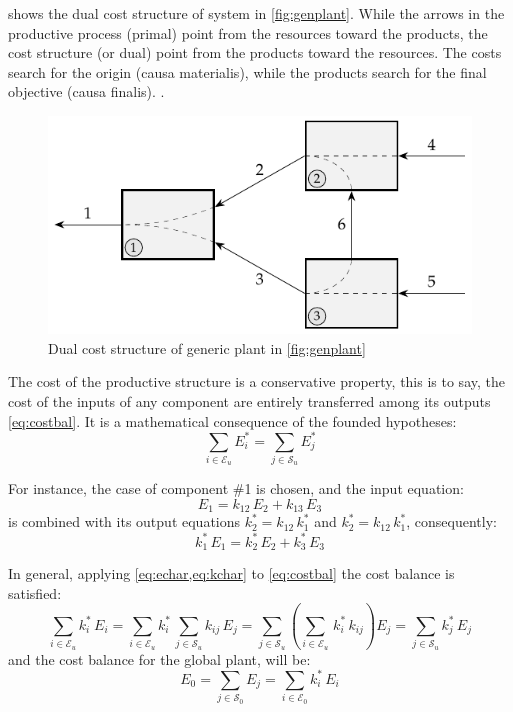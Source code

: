 \documentclass[energies,article,submit,moreauthors,pdftex]{Definitions/mdpi}
\begin{document}
 shows the dual cost structure of system in \cref{fig:genplant}. While the arrows in the productive process (primal) point from the resources toward the products, the cost structure (or dual) point from the products toward the resources. The costs search for the origin (causa materialis), while the products search for the final objective (causa finalis). \cite{Valero1990d}.

\begin{figure}[ht]
    \centering
    \includegraphics{genplantr}
    \caption{Dual cost structure of generic plant in \cref{fig:genplant}}
    \label{fig:genplantr}
\end{figure}

The cost of the productive structure is a conservative property, this is to say, the cost of the inputs of any component are entirely transferred among its outputs \cref{eq:costbal}. It is a mathematical consequence of the founded hypotheses:
\begin{equation}
    \sum_{i\in\mathcal{E}_u}{E_i^*}=\sum_{j\in\mathcal{S}_u}{E_j^*}
    \label{eq:costbal}
\end{equation}

For instance, the case of component \#1 is chosen, and the input equation:
\[
E_1=k_{12}\,E_2+k_{13}\,E_3
\] 
is combined with its output equations $k_2^*=k_{12}\,k_1^*$ and $k_2^*=k_{12}\,k_1^*$, consequently: 
\[
 k_1^*\,E_1 = k_2^*\,E_2+k_3^*\,E_3
\]

In general, applying \cref{eq:echar,eq:kchar} to \cref{eq:costbal} the cost balance is satisfied:
\begin{equation}
    \sum_{i\in\mathcal{E}_u}{k_i^*\,E_i}=\sum_{i\in\mathcal{E}_u}{k_i^*\,\sum_{j\in\mathcal{S}_u}{k_{ij}\,E_j}}=\sum_{j\in\mathcal{S}_u}{\left(\sum_{i\in\mathcal{E}_u}\,k_i^*\,k_{ij}\right)E_j}=\sum_{j\in\mathcal{S}_u}{k_j^*\,E_j}
\end{equation}
and the cost balance for the global plant, will be:
\begin{equation}
    E_0=\sum_{j\in\mathcal{S}_0}{E_j}=\sum_{i\in\mathcal{E}_0}{k_i^*\,E_i}
\end{equation}
\end{document}
